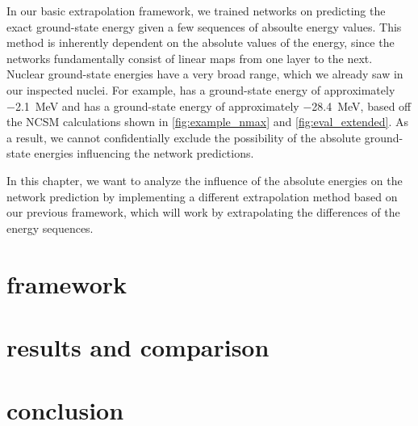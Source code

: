 In our basic extrapolation framework, we trained networks on predicting the exact ground-state energy given a few sequences of absoulte energy values. This method is inherently dependent on the absolute values of the energy, since the networks fundamentally consist of linear maps from one layer to the next. Nuclear ground-state energies have a very broad range, which we already saw in our inspected nuclei. For example,  has a ground-state energy of approximately \SI{-2.1}{\mega\electronvolt} and  has a ground-state energy of approximately \SI{-28.4}{\mega\electronvolt}, based off the NCSM calculations shown in \autoref{fig:example_nmax} and \autoref{fig:eval_extended}. As a result, we cannot confidentially exclude the possibility of the absolute ground-state energies influencing the network predictions.

In this chapter, we want to analyze the influence of the absolute energies on the network prediction by implementing a different extrapolation method based on our previous framework, which will work by extrapolating the differences of the energy sequences.
\section{framework}

\section{results and comparison}

\section{conclusion}
